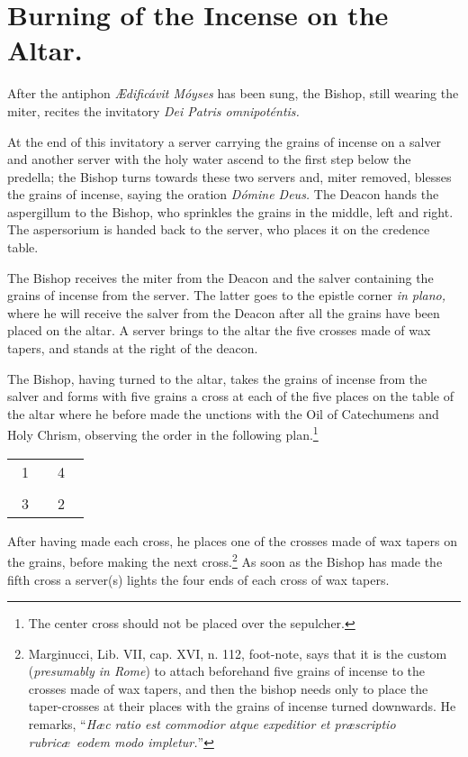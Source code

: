 \documentclass[letterpaper]{report}
\newcommand\crossplan{
\begin{center}
    \begin{tabular}{ | l c r | }
       \hline
        \cross\ {\tiny 1} &         & {\tiny 4} \cross\ \\
                           & \cross &           \\
        \cross\ {\tiny 3} &         & {\tiny 2} \cross\ \\
       \hline
   \end{tabular} 
\end{center}
}
\begin{document}
{    \section{Burning of the Incense on the Altar.}

    \rubric After the antiphon \textit{\AE dificávit Móyses} has been sung, the
    Bishop, still wearing the miter, recites the invitatory \textit{Dei Patris
    omnipoténtis.}

    \rubric At the end of this invitatory a server carrying the grains of
    incense on a salver and another server with the holy water ascend to the
    first step below the predella; the Bishop turns towards these two servers
    and, miter removed, blesses the grains of incense, saying the oration
    \textit{Dómine Deus.} The Deacon hands the aspergillum to the Bishop, who
    sprinkles the grains in the middle, left and right. The aspersorium is
    handed back to the server, who places it on the credence table.

    \rubric The Bishop receives the miter from the Deacon and the salver
    containing the grains of incense from the server. The latter goes to the
    epistle corner \textit{in plano,} where he will receive the salver from the
    Deacon after all the grains have been placed on the altar. A server brings
    to the altar the five crosses made of wax tapers, and stands at the right
    of the deacon.

    \rubric The Bishop, having turned to the altar, takes the grains of incense
    from the salver and forms with five grains a cross at each of the five
    places on the table of the altar where he before made the unctions with the
    Oil of Catechumens and Holy Chrism, observing the order in the following
    plan.\footnote{The center cross should not be placed over the sepulcher.}

    \crossplan

    After having made each cross, he places one of the crosses made of wax
    tapers on the grains, before making the next cross.\footnote{Marginucci,
    Lib. VII, cap. XVI, n. 112, foot-note, says that it is the custom
    (\textit{presumably in Rome}) to attach beforehand five grains of incense
    to the crosses made of wax tapers, and then the bishop needs only to place
    the taper-crosses at their places with the grains of incense turned
    downwards. He remarks, ``\textit{H\ae c ratio est commodior atque
    expeditior et pr\ae scriptio rubric\ae\ eodem modo impletur.}''} As soon as
    the Bishop has made the fifth cross a server(s) lights the four ends of
    each cross of wax tapers.

}
\end{document}
